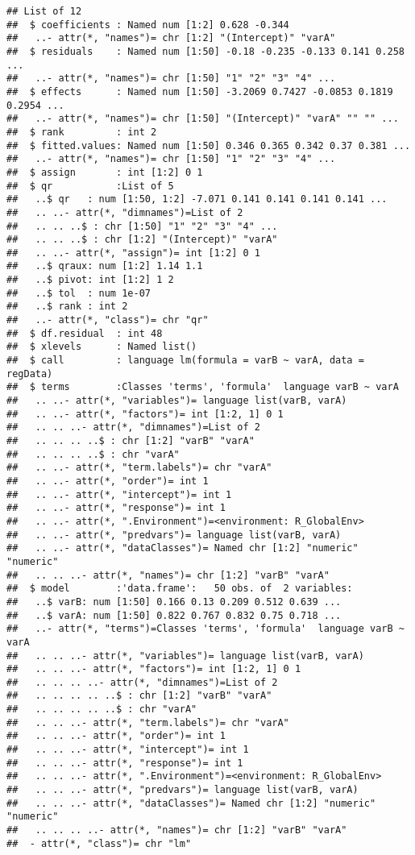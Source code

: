 \documentclass[
]{article}
\begin{document}
\begin{verbatim}
## List of 12
##  $ coefficients : Named num [1:2] 0.628 -0.344
##   ..- attr(*, "names")= chr [1:2] "(Intercept)" "varA"
##  $ residuals    : Named num [1:50] -0.18 -0.235 -0.133 0.141 0.258 ...
##   ..- attr(*, "names")= chr [1:50] "1" "2" "3" "4" ...
##  $ effects      : Named num [1:50] -3.2069 0.7427 -0.0853 0.1819 0.2954 ...
##   ..- attr(*, "names")= chr [1:50] "(Intercept)" "varA" "" "" ...
##  $ rank         : int 2
##  $ fitted.values: Named num [1:50] 0.346 0.365 0.342 0.37 0.381 ...
##   ..- attr(*, "names")= chr [1:50] "1" "2" "3" "4" ...
##  $ assign       : int [1:2] 0 1
##  $ qr           :List of 5
##   ..$ qr   : num [1:50, 1:2] -7.071 0.141 0.141 0.141 0.141 ...
##   .. ..- attr(*, "dimnames")=List of 2
##   .. .. ..$ : chr [1:50] "1" "2" "3" "4" ...
##   .. .. ..$ : chr [1:2] "(Intercept)" "varA"
##   .. ..- attr(*, "assign")= int [1:2] 0 1
##   ..$ qraux: num [1:2] 1.14 1.1
##   ..$ pivot: int [1:2] 1 2
##   ..$ tol  : num 1e-07
##   ..$ rank : int 2
##   ..- attr(*, "class")= chr "qr"
##  $ df.residual  : int 48
##  $ xlevels      : Named list()
##  $ call         : language lm(formula = varB ~ varA, data = regData)
##  $ terms        :Classes 'terms', 'formula'  language varB ~ varA
##   .. ..- attr(*, "variables")= language list(varB, varA)
##   .. ..- attr(*, "factors")= int [1:2, 1] 0 1
##   .. .. ..- attr(*, "dimnames")=List of 2
##   .. .. .. ..$ : chr [1:2] "varB" "varA"
##   .. .. .. ..$ : chr "varA"
##   .. ..- attr(*, "term.labels")= chr "varA"
##   .. ..- attr(*, "order")= int 1
##   .. ..- attr(*, "intercept")= int 1
##   .. ..- attr(*, "response")= int 1
##   .. ..- attr(*, ".Environment")=<environment: R_GlobalEnv> 
##   .. ..- attr(*, "predvars")= language list(varB, varA)
##   .. ..- attr(*, "dataClasses")= Named chr [1:2] "numeric" "numeric"
##   .. .. ..- attr(*, "names")= chr [1:2] "varB" "varA"
##  $ model        :'data.frame':   50 obs. of  2 variables:
##   ..$ varB: num [1:50] 0.166 0.13 0.209 0.512 0.639 ...
##   ..$ varA: num [1:50] 0.822 0.767 0.832 0.75 0.718 ...
##   ..- attr(*, "terms")=Classes 'terms', 'formula'  language varB ~ varA
##   .. .. ..- attr(*, "variables")= language list(varB, varA)
##   .. .. ..- attr(*, "factors")= int [1:2, 1] 0 1
##   .. .. .. ..- attr(*, "dimnames")=List of 2
##   .. .. .. .. ..$ : chr [1:2] "varB" "varA"
##   .. .. .. .. ..$ : chr "varA"
##   .. .. ..- attr(*, "term.labels")= chr "varA"
##   .. .. ..- attr(*, "order")= int 1
##   .. .. ..- attr(*, "intercept")= int 1
##   .. .. ..- attr(*, "response")= int 1
##   .. .. ..- attr(*, ".Environment")=<environment: R_GlobalEnv> 
##   .. .. ..- attr(*, "predvars")= language list(varB, varA)
##   .. .. ..- attr(*, "dataClasses")= Named chr [1:2] "numeric" "numeric"
##   .. .. .. ..- attr(*, "names")= chr [1:2] "varB" "varA"
##  - attr(*, "class")= chr "lm"
\end{verbatim}
\end{document}
